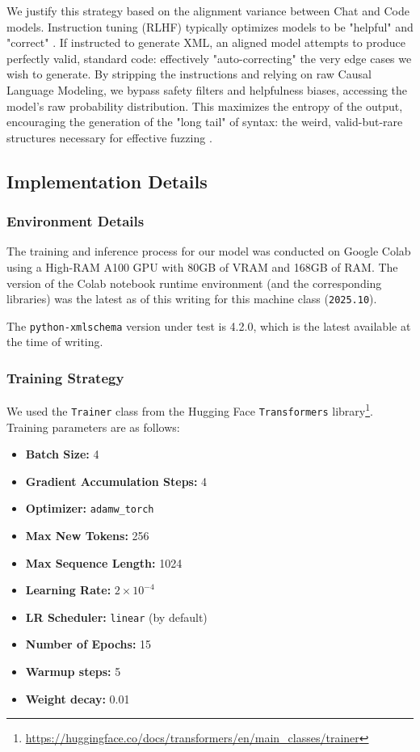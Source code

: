 \documentclass[11pt]{article}
\begin{document}
We justify this strategy based on the alignment variance between Chat and Code models. Instruction tuning (RLHF) typically optimizes models to be "helpful" and "correct" \cite{ouyang2022traininglanguagemodelsfollow}. If instructed to generate XML, an aligned model attempts to produce perfectly valid, standard code: effectively "auto-correcting" the very edge cases we wish to generate. By stripping the instructions and relying on raw Causal Language Modeling, we bypass safety filters and helpfulness biases, accessing the model's raw probability distribution. This maximizes the entropy of the output, encouraging the generation of the "long tail" of syntax: the weird, valid-but-rare structures necessary for effective fuzzing \cite{godefroid2017learnfuzzmachinelearninginput}.

\subsection{Implementation Details}

\subsubsection{Environment Details}
\label{sec:env}

The training and inference process for our model was conducted on Google Colab using a High-RAM A100 GPU with 80GB of VRAM and 168GB of RAM. The version of the Colab notebook runtime environment (and the corresponding libraries) was the latest as of this writing for this machine class (\texttt{2025.10}).

The \texttt{python-xmlschema} version under test is 4.2.0, which is the latest available at the time of writing.

\subsubsection{Training Strategy} 

We used the \texttt{Trainer} class from the Hugging Face \texttt{Transformers} library\footnote{\url{https://huggingface.co/docs/transformers/en/main_classes/trainer}}. Training parameters are as follows:

\begin{itemize}
    \item \textbf{Batch Size:} 4
    \item \textbf{Gradient Accumulation Steps:} 4
    \item \textbf{Optimizer:} \texttt{adamw\_torch}
    \item \textbf{Max New Tokens:} 256
    \item \textbf{Max Sequence Length:} 1024
    \item \textbf{Learning Rate:} $2 \times 10^{-4}$
    \item \textbf{LR Scheduler:} \texttt{linear} (by default)
    \item \textbf{Number of Epochs:} 15
    \item \textbf{Warmup steps:} 5
    \item \textbf{Weight decay:} 0.01
\end{itemize}
\end{document}
